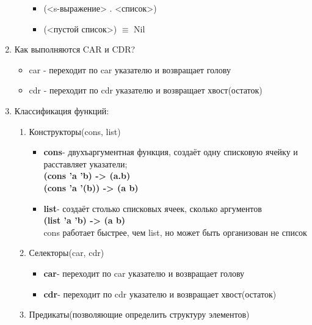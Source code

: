 \begin{enumerate}
\begin{itemize}
                \begin{itemize}
                    \item (<s-выражение> . <список>)
                    \item (<пустой список>) $\equiv$ Nil
                \end{itemize}
        \end{itemize}
    \item\Large{Как выполняются CAR и CDR?}
        \begin{itemize}
            \item car - переходит по car указателю и возвращает голову
            \item cdr - переходит по cdr указателю и возвращает хвост(остаток)
        \end{itemize}
    \item Классификация функций:
        \begin{enumerate}
            \item Конструкторы(cons, list)
                \begin{itemize}
                    \item \textbf{cons}- двухъаргументная функция, создаёт одну списковую ячейку и расставляет указатели;
                        \\ \textbf{(cons 'a 'b) -> (a.b)} 
                        \\ \textbf{(cons 'a '(b)) -> (a b)}
                    \item \textbf{list}- создаёт столько списковых ячеек, сколько аргументов
                        \\ \textbf{(list 'a 'b) -> (a b)}
                    \\
                    cons работает быстрее, чем list, но может быть организован не список
                \end{itemize}
            \item Селекторы(car, cdr)
                \begin{itemize}
                    \item \textbf{car}- переходит по car указателю и возвращает голову
                    \item \textbf{cdr}- переходит по cdr указателю и возвращает хвост(остаток)
                \end{itemize}
            \item Предикаты(позволяющие определить структуру элементов)
                \begin{itemize}

\end{itemize}
\end{enumerate}
\end{enumerate}
